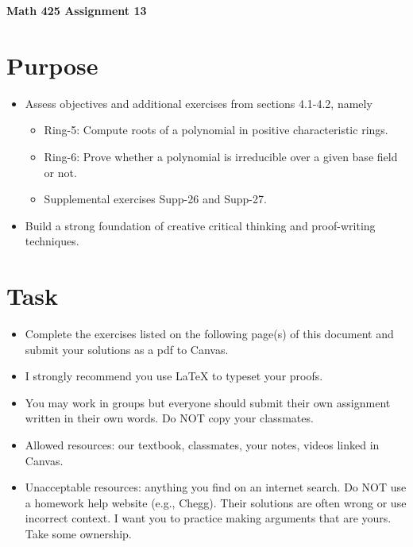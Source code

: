 \documentclass[12pt]{article}
\begin{document}
	\begin{center}
		{\Large \bf Math 425 Assignment 13}
	\end{center}
	\section*{Purpose}
	\begin{itemize}
		\item Assess objectives and additional exercises from sections 4.1-4.2, namely
		\begin{itemize} 
			\item Ring-5: Compute roots of a polynomial in positive characteristic rings.
			\item Ring-6:	Prove whether a polynomial is irreducible over a given base field or not.
			\item Supplemental exercises Supp-26 and Supp-27.
		\end{itemize}
		\item Build a strong foundation of creative critical thinking and proof-writing techniques.
	\end{itemize}
	\section*{Task}
	\begin{itemize}
		\item Complete the exercises listed on the following page(s) of this document and submit your solutions as a pdf to Canvas.
		\item I strongly recommend you use LaTeX to typeset your proofs.
		\item You may work in groups but everyone should submit their own assignment written in their own words.  Do NOT copy your classmates.
		\item Allowed resources: our textbook, classmates, your notes, videos linked in Canvas.
		\item Unacceptable resources: anything you find on an internet search. Do NOT use a homework help website (e.g., Chegg). Their solutions are often wrong or use incorrect context.  I want you to practice making arguments that are yours. Take some ownership.
	\end{itemize}
\end{document}
